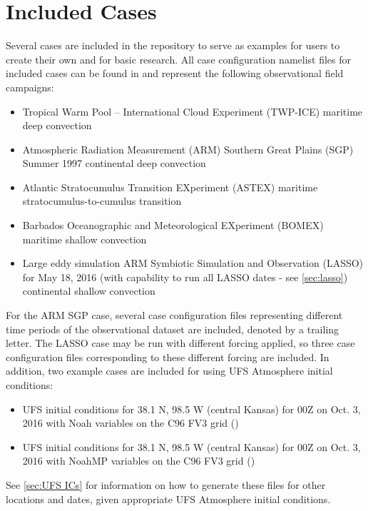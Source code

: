 

\section{Included Cases}
Several cases are included in the repository to serve as examples for users to create their own and for basic research. All case configuration namelist files for included cases can be found in  and represent the following observational field campaigns:
\begin{itemize}
\item Tropical Warm Pool -- International Cloud Experiment (TWP-ICE) maritime deep convection
\item Atmospheric Radiation Measurement (ARM) Southern Great Plains (SGP) Summer 1997 continental deep convection
\item Atlantic Stratocumulus Transition EXperiment (ASTEX) maritime stratocumulus-to-cumulus transition
\item Barbados Oceanographic and Meteorological EXperiment (BOMEX) maritime shallow convection
\item Large eddy simulation ARM Symbiotic Simulation and Observation (LASSO) for May 18, 2016 (with capability to run all LASSO dates - see \ref{sec:lasso}) continental shallow convection
\end{itemize}
For the ARM SGP case, several case configuration files representing different time periods of the observational dataset are included, denoted by a trailing letter. The LASSO case may be run with different forcing applied, so three case configuration files corresponding to these different forcing are included. In addition, two example cases are included for using UFS Atmosphere initial conditions:
\begin{itemize}
\item UFS initial conditions for 38.1 N, 98.5 W (central Kansas) for 00Z on Oct. 3, 2016 with Noah variables on the C96 FV3 grid ()
\item UFS initial conditions for 38.1 N, 98.5 W (central Kansas) for 00Z on Oct. 3, 2016 with NoahMP variables on the C96 FV3 grid ()
\end{itemize}
See \ref{sec:UFS ICs} for information on how to generate these files for other locations and dates, given appropriate UFS Atmosphere initial conditions.

